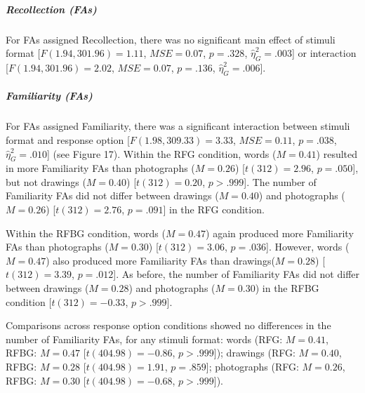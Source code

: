 \documentclass[
  11pt,
]{article}
\begin{document}
\hypertarget{recollection-fas}{%
\subparagraph{Recollection (FAs)}\label{recollection-fas}}

For FAs assigned Recollection, there was no significant main effect of
stimuli format {[}\(F(1.94, 301.96) = 1.11\), \(\mathit{MSE} = 0.07\),
\(p = .328\), \(\hat{\eta}^2_G = .003\){]} or interaction
{[}\(F(1.94, 301.96) = 2.02\), \(\mathit{MSE} = 0.07\), \(p = .136\),
\(\hat{\eta}^2_G = .006\){]}.

\hypertarget{familiarity-fas}{%
\subparagraph{Familiarity (FAs)}\label{familiarity-fas}}

For FAs assigned Familiarity, there was a significant interaction
between stimuli format and response option
{[}\(F(1.98, 309.33) = 3.33\), \(\mathit{MSE} = 0.11\), \(p = .038\),
\(\hat{\eta}^2_G = .010\){]} (see Figure 17). Within the RFG condition,
words (\(M = 0.41\)) resulted in more Familiarity FAs than photographs
(\(M = 0.26\)) {[}\(t(312) = 2.96\), \(p = .050\){]}, but not drawings
(\(M = 0.40\)) {[}\(t(312) = 0.20\), \(p > .999\){]}. The number of
Familiarity FAs did not differ between drawings (\(M = 0.40\)) and
photographs (\(M = 0.26\)) {[}\(t(312) = 2.76\), \(p = .091\){]} in the
RFG condition.

Within the RFBG condition, words (\(M = 0.47\)) again produced more
Familiarity FAs than photographs (\(M = 0.30\)) {[}\(t(312) = 3.06\),
\(p = .036\){]}. However, words (\(M = 0.47\)) also produced more
Familiarity FAs than drawings(\(M = 0.28\)) {[}\(t(312) = 3.39\),
\(p = .012\){]}. As before, the number of Familiarity FAs did not differ
between drawings (\(M = 0.28\)) and photographs (\(M = 0.30\)) in the
RFBG condition {[}\(t(312) = -0.33\), \(p > .999\){]}.

Comparisons across response option conditions showed no differences in
the number of Familiarity FAs, for any stimuli format: words (RFG:
\(M = 0.41\), RFBG: \(M = 0.47\) {[}\(t(404.98) = -0.86\),
\(p > .999\){]}); drawings (RFG: \(M = 0.40\), RFBG: \(M = 0.28\)
{[}\(t(404.98) = 1.91\), \(p = .859\){]}; photographs (RFG:
\(M = 0.26\), RFBG: \(M = 0.30\) {[}\(t(404.98) = -0.68\),
\(p > .999\){]}).

~
\end{document}
